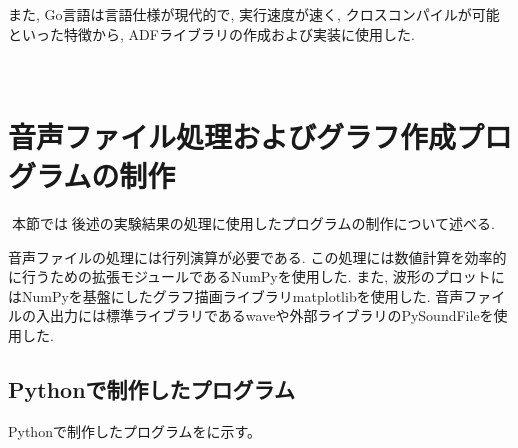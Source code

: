 また, Go言語は言語仕様が現代的で, 実行速度が速く, クロスコンパイルが可能といった特徴から, ADFライブラリの作成および実装に使用した. 



\
\section{音声ファイル処理およびグラフ作成プログラムの制作}\label{create-program}

本節では後述の実験結果の処理に使用したプログラムの制作について述べる. 

音声ファイルの処理には行列演算が必要である. この処理には数値計算を効率的に行うための拡張モジュールであるNumPyを使用した. また, 波形のプロットにはNumPyを基盤にしたグラフ描画ライブラリmatplotlibを使用した. 
音声ファイルの入出力には標準ライブラリであるwaveや外部ライブラリのPySoundFileを使用した. 


\subsection{Pythonで制作したプログラム}\label{python}

Pythonで制作したプログラムをに示す。

